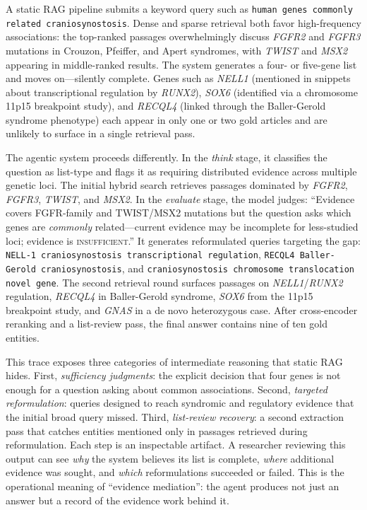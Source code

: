 \documentclass[sigconf,anonymous,review]{acmart}
\begin{document}
A static RAG pipeline submits a keyword query such as \texttt{human genes commonly related craniosynostosis}.
Dense and sparse retrieval both favor high-frequency associations: the top-ranked passages overwhelmingly discuss \emph{FGFR2} and \emph{FGFR3} mutations in Crouzon, Pfeiffer, and Apert syndromes, with \emph{TWIST} and \emph{MSX2} appearing in middle-ranked results.
The system generates a four- or five-gene list and moves on---silently complete.
Genes such as \emph{NELL1} (mentioned in snippets about transcriptional regulation by \emph{RUNX2}), \emph{SOX6} (identified via a chromosome 11p15 breakpoint study), and \emph{RECQL4} (linked through the Baller-Gerold syndrome phenotype) each appear in only one or two gold articles and are unlikely to surface in a single retrieval pass.

The agentic system proceeds differently.
In the \emph{think} stage, it classifies the question as list-type and flags it as requiring distributed evidence across multiple genetic loci.
The initial hybrid search retrieves passages dominated by \emph{FGFR2}, \emph{FGFR3}, \emph{TWIST}, and \emph{MSX2}.
In the \emph{evaluate} stage, the model judges: ``Evidence covers FGFR-family and TWIST/MSX2 mutations but the question asks which genes are \emph{commonly} related---current evidence may be incomplete for less-studied loci; evidence is \textsc{insufficient}.''
It generates reformulated queries targeting the gap: \texttt{NELL-1 craniosynostosis transcriptional regulation}, \texttt{RECQL4 Baller-Gerold craniosynostosis}, and \texttt{craniosynostosis chromosome translocation novel gene}.
The second retrieval round surfaces passages on \emph{NELL1}/\emph{RUNX2} regulation, \emph{RECQL4} in Baller-Gerold syndrome, \emph{SOX6} from the 11p15 breakpoint study, and \emph{GNAS} in a de novo heterozygous case.
After cross-encoder reranking and a list-review pass, the final answer contains nine of ten gold entities.

This trace exposes three categories of intermediate reasoning that static RAG hides.
First, \emph{sufficiency judgments}: the explicit decision that four genes is not enough for a question asking about common associations.
Second, \emph{targeted reformulation}: queries designed to reach syndromic and regulatory evidence that the initial broad query missed.
Third, \emph{list-review recovery}: a second extraction pass that catches entities mentioned only in passages retrieved during reformulation.
Each step is an inspectable artifact.
A researcher reviewing this output can see \emph{why} the system believes its list is complete, \emph{where} additional evidence was sought, and \emph{which} reformulations succeeded or failed.
This is the operational meaning of ``evidence mediation'': the agent produces not just an answer but a record of the evidence work behind it.
\end{document}
